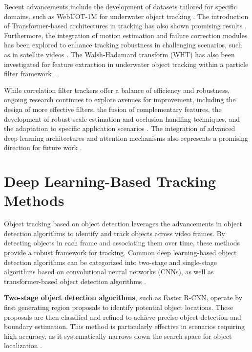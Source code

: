 Recent advancements include the development of datasets tailored for specific domains, such as WebUOT-1M for underwater object tracking \cite{zhang2024webuot}. The introduction of Transformer-based architectures in tracking has also shown promising results \cite{zhang2024webuot}. Furthermore, the integration of motion estimation and failure correction modules has been explored to enhance tracking robustness in challenging scenarios, such as in satellite videos \cite{lin2024motion}. The Walsh-Hadamard transform (WHT) has also been investigated for feature extraction in underwater object tracking within a particle filter framework \cite{rout2019walsh}.

While correlation filter trackers offer a balance of efficiency and robustness, ongoing research continues to explore avenues for improvement, including the design of more effective filters, the fusion of complementary features, the development of robust scale estimation and occlusion handling techniques, and the adaptation to specific application scenarios \cite{du2021overview, zhao2020correlation}. The integration of advanced deep learning architectures and attention mechanisms also represents a promising direction for future work \cite{qiu2024boundary}.


\section{Deep Learning-Based Tracking Methods}
\label{sec:deep}

Object tracking based on object detection leverages the advancements in object detection algorithms to identify and track objects across video frames. By detecting objects in each frame and associating them over time, these methods provide a robust framework for tracking. Common deep learning-based object detection algorithms can be categorized into two-stage and single-stage algorithms based on convolutional neural networks (CNNs), as well as transformer-based object detection algorithms \cite{zhou2024real}.

\textbf{Two-stage object detection algorithms}, such as Faster R-CNN, operate by first generating region proposals to identify potential object locations. These proposals are then classified and refined to achieve precise object detection and boundary estimation. This method is particularly effective in scenarios requiring high accuracy, as it systematically narrows down the search space for object localization \cite{zhou2024real}.

